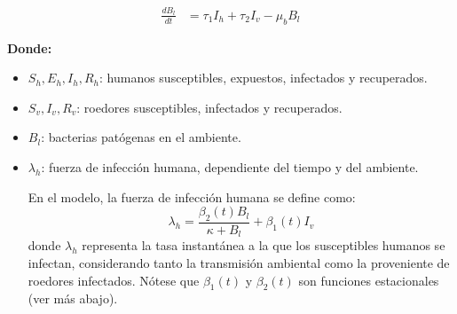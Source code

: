 \documentclass[12pt,a4paper]{article}
\begin{document}
\begin{align*}
\frac{dB_l}{dt} &= \tau_1 I_h + \tau_2 I_v - \mu_b B_l
\end{align*}

\textbf{Donde:}
\begin{itemize}
    \item $S_h, E_h, I_h, R_h$: humanos susceptibles, expuestos, infectados y recuperados.
    \item $S_v, I_v, R_v$: roedores susceptibles, infectados y recuperados.
    \item $B_l$: bacterias patógenas en el ambiente.
    \item $\lambda_h$: fuerza de infección humana, dependiente del tiempo y del ambiente.

    En el modelo, la fuerza de infección humana se define como:
    \[
    \lambda_h = \frac{\beta_2(t) B_l}{\kappa + B_l} + \beta_1(t) I_v
    \]
    donde $\lambda_h$ representa la tasa instantánea a la que los susceptibles humanos se infectan, considerando tanto la transmisión ambiental como la proveniente de roedores infectados. Nótese que $\beta_1(t)$ y $\beta_2(t)$ son funciones estacionales (ver más abajo).
\end{itemize}
\end{document}

